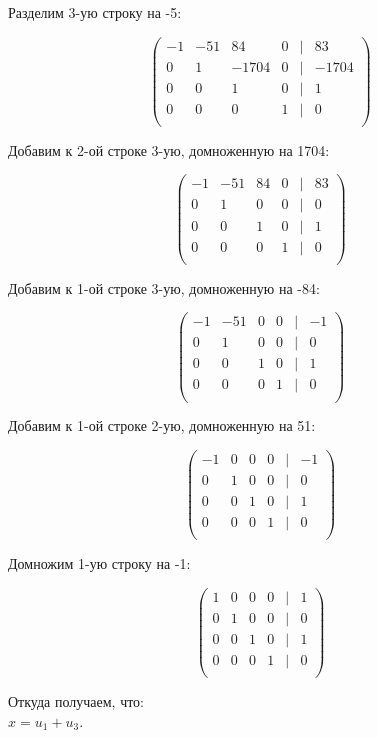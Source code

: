 	Разделим 3-ую строку на -5:
	
	\[
	\begin{pmatrix}
	-1 & -51 & 84 & 0 & | & 83 \\
	0 & 1 & -1704 & 0 & | & -1704 \\
	0 & 0 & 1 & 0 & | & 1 \\
	0 & 0 & 0 & 1 & | & 0 \\
	\end{pmatrix}
	\]
	
	Добавим к 2-ой строке 3-ую, домноженную на 1704:
	
	\[
	\begin{pmatrix}
	-1 & -51 & 84 & 0 & | & 83 \\
	0 & 1 & 0 & 0 & | & 0 \\
	0 & 0 & 1 & 0 & | & 1 \\
	0 & 0 & 0 & 1 & | & 0 \\
	\end{pmatrix}
	\]
	
	Добавим к 1-ой строке 3-ую, домноженную на -84:
	
	\[
	\begin{pmatrix}
	-1 & -51 & 0 & 0 & | & -1 \\
	0 & 1 & 0 & 0 & | & 0 \\
	0 & 0 & 1 & 0 & | & 1 \\
	0 & 0 & 0 & 1 & | & 0 \\
	\end{pmatrix}
	\]
	
	Добавим к 1-ой строке 2-ую, домноженную на 51:
	
	\[
	\begin{pmatrix}
	-1 & 0 & 0 & 0 & | & -1 \\
	0 & 1 & 0 & 0 & | & 0 \\
	0 & 0 & 1 & 0 & | & 1 \\
	0 & 0 & 0 & 1 & | & 0 \\
	\end{pmatrix}
	\]
	
	Домножим 1-ую строку на -1:
	
	\[
	\begin{pmatrix}
	1 & 0 & 0 & 0 & | & 1 \\
	0 & 1 & 0 & 0 & | & 0 \\
	0 & 0 & 1 & 0 & | & 1 \\
	0 & 0 & 0 & 1 & | & 0 \\
	\end{pmatrix}
	\]
	
	Откуда получаем, что: \\$x = u_1 + u_3$.
	
